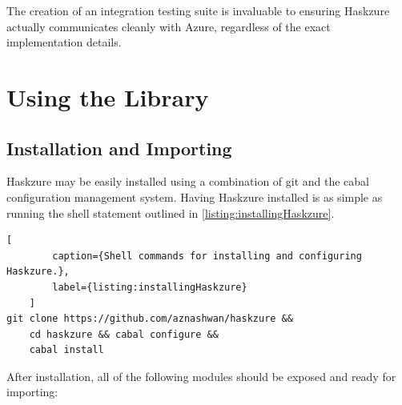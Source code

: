 \documentclass[11pt]{report}
\begin{document}
The creation of an integration testing suite is invaluable to ensuring
Haskzure actually communicates cleanly with Azure, regardless of the exact
implementation details.

\chapter{Using the Library} %

\section{Installation and Importing}

Haskzure may be easily installed using a combination of git and the cabal
configuration management system. Having Haskzure installed is as simple as
running the shell statement outlined in \autoref{listing:installingHaskzure}.

\begin{lstlisting}[
        caption={Shell commands for installing and configuring Haskzure.},
        label={listing:installingHaskzure}
    ]
git clone https://github.com/aznashwan/haskzure &&
    cd haskzure && cabal configure &&
    cabal install
\end{lstlisting}

After installation, all of the following modules should be exposed and ready
for importing:
\end{document}
